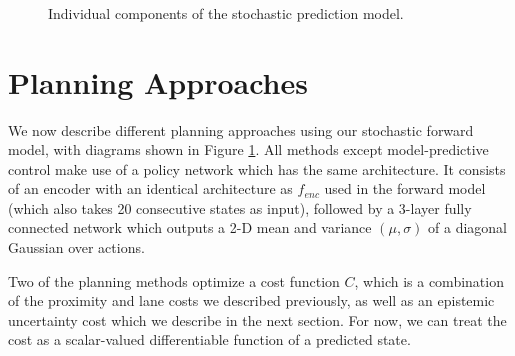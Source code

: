 \documentclass{article} %
\begin{document}
\begin{figure}[t!]
    \centering
     \\
     \\
     \\
    \caption{Individual components of the stochastic prediction model.}
\end{figure}
\label{model-components}


\section{Planning Approaches}
  \label{planning-methods}

  We now describe different planning approaches using our stochastic forward model, with diagrams shown in Figure \ref{planning-methods}.
  All methods except model-predictive control make use of a policy network which has the same architecture.
  It consists of an encoder with an identical architecture as $f_{enc}$ used in the forward model (which also takes 20 consecutive states as input), followed by a 3-layer fully connected network which outputs a 2-D mean and variance $(\mu, \sigma)$ of a diagonal Gaussian over actions.

  Two of the planning methods optimize a cost function $C$, which is a combination of the proximity and lane costs we described previously, as well as an epistemic uncertainty cost which we describe in the next section. For now, we can treat the cost as a scalar-valued differentiable function of a predicted state.
\end{document}
